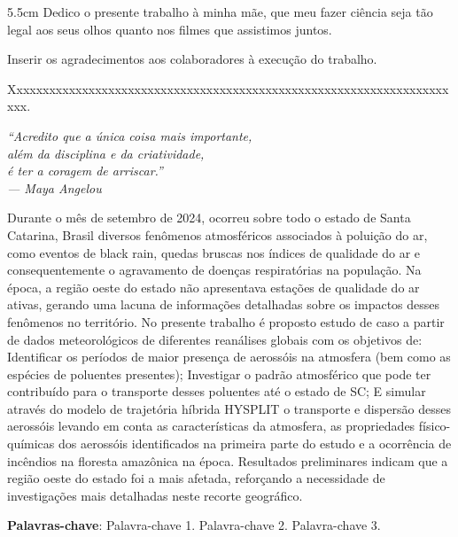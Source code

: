 \begin{dedicatoria}
	\vspace*{\fill}
	\noindent
	\begin{adjustwidth*}{}{5.5cm}     
		Dedico o presente trabalho à minha mãe, que meu fazer ciência seja tão legal aos seus olhos quanto nos filmes que assistimos juntos.
		
	\end{adjustwidth*}
\end{dedicatoria}

\begin{agradecimentos}
	Inserir os agradecimentos aos colaboradores à execução do trabalho. 
	
	Xxxxxxxxxxxxxxxxxxxxxxxxxxxxxxxxxxxxxxxxxxxxxxxxxxxxxxxxxxxxxxxxxxxxxx. 
\end{agradecimentos}

\begin{epigrafe}
	\vspace*{\fill}
	\begin{flushright}
		\textit{“Acredito que a única coisa 	 mais importante,\\
		 além da disciplina e da criatividade,\\ 
		é ter a coragem de arriscar.”\\
			— Maya Angelou
		}
	\end{flushright}
\end{epigrafe}


\setlength{\absparsep}{18pt} %
\begin{resumo}
	\SingleSpacing
Durante o mês de setembro de 2024, ocorreu sobre todo o estado de Santa Catarina, Brasil diversos fenômenos atmosféricos associados à poluição do ar, como eventos de black rain, quedas bruscas nos índices de qualidade do ar e consequentemente o agravamento de doenças respiratórias na população. Na época, a região oeste do estado não apresentava estações de qualidade do ar ativas, gerando uma lacuna de informações detalhadas sobre os impactos desses fenômenos no território. No presente trabalho é proposto estudo de caso a partir de dados meteorológicos de diferentes reanálises globais com os objetivos de: Identificar os períodos de maior presença de aerossóis na atmosfera (bem como as espécies de poluentes presentes); Investigar o padrão atmosférico que pode ter contribuído para o transporte desses poluentes até o estado de SC; E simular através do modelo de trajetória híbrida HYSPLIT o transporte e dispersão desses aerossóis levando em conta as características da atmosfera, as propriedades físico-químicas dos aerossóis identificados na primeira parte do estudo e a ocorrência de incêndios na floresta amazônica na época. Resultados preliminares indicam que a região oeste do estado foi a mais afetada, reforçando a necessidade de investigações mais detalhadas neste recorte geográfico.
	
	\textbf{Palavras-chave}: Palavra-chave 1. Palavra-chave 2. Palavra-chave 3.
\end{resumo}

